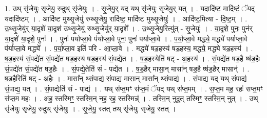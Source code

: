 \documentclass[17pt]{extarticle}
\begin{document}
1. उथ् सृ॑जेयुः सृजेयु॒ रुदुथ् सृ॑जेयुः । . सृ॒जे॒यु॒र् यद् यथ् सृ॑जेयुः सृजेयु॒र् यत् । . यदादि॑ष्ट॒ मादि॑ष्टं॒ ॅयद् यदादि॑ष्टम् । . आदि॑ष्ट मुथ्सृ॒जेयु॑ रुथ्सृ॒जेयु॒ रादि॑ष्ट॒ मादि॑ष्ट मुथ्सृ॒जेयुः॑ । . आदि॑ष्ट॒मित्या - दि॒ष्ट॒म् । . उ॒थ्सृ॒जेयु॑र् या॒दृशे॑ या॒दृश॑ उथ्सृ॒जेयु॑ रुथ्सृ॒जेयु॑र् या॒दृशे᳚ । . उ॒थ्सृ॒जेयु॒रित्यु॑त् - सृ॒जेयुः॑ । . या॒दृशे॒ पुनः॒ पुन॑र् या॒दृशे॑ या॒दृशे॒ पुनः॑ । . पुनः॑ पर्याप्ला॒वे प॑र्याप्ला॒वे पुनः॒ पुनः॑ पर्याप्ला॒वे । . प॒र्या॒प्ला॒वे मद्ध्ये॒ मद्ध्ये॑ पर्याप्ला॒वे प॑र्याप्ला॒वे मद्ध्ये᳚ । . प॒र्या॒प्ला॒व इति॑ परि - आ॒प्ला॒वे । . मद्ध्ये॑ षड॒हस्य॑ षड॒हस्य॒ मद्ध्ये॒ मद्ध्ये॑ षड॒हस्य॑ । . ष॒ड॒हस्य॑ सं॒पद्ये॑त सं॒पद्ये॑त षड॒हस्य॑ षड॒हस्य॑ सं॒पद्ये॑त । . ष॒ड॒हस्येति॑ षट् - अ॒हस्य॑ । . सं॒पद्ये॑त षड॒है ष्ष॑ड॒हैः सं॒पद्ये॑त सं॒पद्ये॑त षड॒हैः । . सं॒पद्ये॒तेति॑ सं - पद्ये॑त । . ष॒ड॒हैर् मासा॒न् मासा᳚न् षड॒है ष्ष॑ड॒हैर् मासान्॑ । . ष॒ड॒हैरिति॑ षट् - अ॒हैः । . मासा᳚न् थ्सं॒पाद्य॑ सं॒पाद्य॒ मासा॒न् मासा᳚न् थ्सं॒पाद्य॑ । . सं॒पाद्य॒ यद् यथ् सं॒पाद्य॑ सं॒पाद्य॒ यत् । . सं॒पाद्येति॑ सं - पाद्य॑ । . यथ् स॑प्त॒मꣳ स॑प्त॒मं ॅयद् यथ् स॑प्त॒मम् । . स॒प्त॒म मह॒ रहः॑ सप्त॒मꣳ स॑प्त॒म महः॑ । . अह॒ स्तस्मिꣳ॒॒ स्तस्मि॒न् नह॒ रह॒ स्तस्मिन्न्॑ । . तस्मि॒न् नुदुत् तस्मिꣳ॒॒ स्तस्मि॒न् नुत् । . उथ् सृ॑जेयुः सृजेयु॒ रुदुथ् सृ॑जेयुः । . सृ॒जे॒यु॒ स्तत् तथ् सृ॑जेयुः सृजेयु॒ स्तत् । \newline
\end{document}
